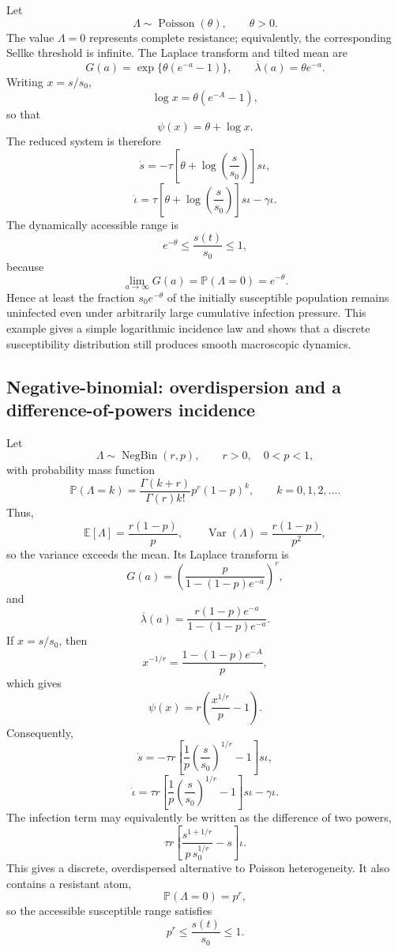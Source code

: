 \documentclass[pdflatex,sn-mathphys-ay]{sn-jnl}
\theoremstyle{thmstyleone}
\theoremstyle{thmstyletwo}
\theoremstyle{thmstylethree}
\newcommand{\E}{\mathbb{E}}
\newcommand{\Pp}{\mathbb{P}}
\begin{document}
Let
\[
\Lambda\sim\operatorname{Poisson}(\theta),
\qquad \theta>0.
\]
The value \(\Lambda=0\) represents complete resistance; equivalently, the
corresponding Sellke threshold is infinite.  The Laplace transform and tilted
mean are
\[
G(a)=\exp\{\theta(e^{-a}-1)\},
\qquad
\overline{\lambda}(a)=\theta e^{-a}.
\]
Writing \(x=s/s_0\),
\[
\log x=\theta(e^{-A}-1),
\]
so that
\[
\psi(x)=\theta+\log x.
\]
The reduced system is therefore
\[
\dot s
=-\tau\left[\theta+\log\left(\frac{s}{s_0}\right)\right]s\iota,
\]
\[
\dot\iota
=\tau\left[\theta+\log\left(\frac{s}{s_0}\right)\right]s\iota
-\gamma\iota.
\]
The dynamically accessible range is
\[
e^{-\theta}\leq \frac{s(t)}{s_0}\leq1,
\]
because
\[
\lim_{a\to\infty}G(a)=\Pp(\Lambda=0)=e^{-\theta}.
\]
Hence at least the fraction \(s_0e^{-\theta}\) of the initially susceptible
population remains uninfected even under arbitrarily large cumulative
infection pressure.  This example gives a simple logarithmic incidence law
and shows that a discrete susceptibility distribution still produces smooth
macroscopic dynamics.

\subsection{Negative-binomial: overdispersion and a difference-of-powers incidence}

Let
\[
\Lambda\sim\operatorname{NegBin}(r,p),
\qquad r>0,\quad 0<p<1,
\]
with probability mass function
\[
\Pp(\Lambda=k)
=\frac{\Gamma(k+r)}{\Gamma(r)k!}p^r(1-p)^k,
\qquad k=0,1,2,\ldots.
\]
Thus,
\[
\E[\Lambda]=\frac{r(1-p)}{p},
\qquad
\operatorname{Var}(\Lambda)=\frac{r(1-p)}{p^2},
\]
so the variance exceeds the mean.  Its Laplace transform is
\[
G(a)
=\left(
\frac{p}{1-(1-p)e^{-a}}
\right)^r,
\]
and
\[
\overline{\lambda}(a)
=\frac{r(1-p)e^{-a}}{1-(1-p)e^{-a}}.
\]
If \(x=s/s_0\), then
\[
x^{-1/r}=\frac{1-(1-p)e^{-A}}{p},
\]
which gives
\[
\psi(x)
=r\left(\frac{x^{1/r}}{p}-1\right).
\]
Consequently,
\[
\dot s
=-\tau r\left[
\frac{1}{p}\left(\frac{s}{s_0}\right)^{1/r}-1
\right]s\iota,
\]
\[
\dot\iota
=\tau r\left[
\frac{1}{p}\left(\frac{s}{s_0}\right)^{1/r}-1
\right]s\iota-\gamma\iota.
\]
The infection term may equivalently be written as the difference of two
powers,
\[
\tau r\left[
\frac{s^{1+1/r}}{p\,s_0^{1/r}}-s
\right]\iota.
\]
This gives a discrete, overdispersed alternative to Poisson heterogeneity.  It
also contains a resistant atom,
\[
\Pp(\Lambda=0)=p^r,
\]
so the accessible susceptible range satisfies
\[
p^r\leq \frac{s(t)}{s_0}\leq1.
\]
\end{document}
